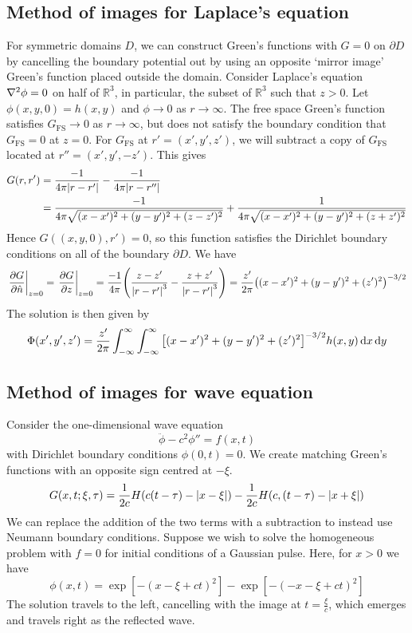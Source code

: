 \subsection{Method of images for Laplace's equation}
For symmetric domains \( D \), we can construct Green's functions with \( G = 0 \) on \( \partial D \) by cancelling the boundary potential out by using an opposite `mirror image' Green's function placed outside the domain.
Consider Laplace's equation \( \laplacian{\phi} = 0 \) on half of \( \mathbb R^3 \), in particular, the subset of \( \mathbb R^3 \) such that \( z > 0 \).
Let \( \phi(x,y,0) = h(x,y) \) and \( \phi \to 0 \) as \( r \to \infty \).
The free space Green's function satisfies \( G_{\mathrm{FS}} \to 0 \) as \( r \to \infty \), but does not satisfy the boundary condition that \( G_{\mathrm{FS}} = 0 \) at \( z = 0 \).
For \( G_{\mathrm{FS}} \) at \( r' = (x',y',z') \), we will subtract a copy of \( G_{\mathrm{FS}} \) located at \( r'' = (x',y',-z') \).
This gives
\begin{align*}
	G(r,r') & = \frac{-1}{4\pi \abs{r - r'}} - \frac{-1}{4\pi \abs{r - r''}}                                                 \\
	        & = \frac{-1}{4\pi \sqrt{(x-x')^2 + (y-y')^2 + (z-z')^2}} + \frac{1}{4\pi \sqrt{(x-x')^2 + (y-y')^2 + (z+z')^2}}
\end{align*}
Hence \( G((x,y,0), r') = 0 \), so this function satisfies the Dirichlet boundary conditions on all of the boundary \( \partial D \).
We have
\[
	\eval{\pdv{G}{\hat n}}_{z = 0} = \eval{\pdv{G}{z}}_{z = 0} = \frac{-1}{4\pi} \qty(\frac{z - z'}{\abs{r - r'}^3} - \frac{z + z'}{\abs{r-r'}^3}) = \frac{z'}{2\pi} \qty((x-x')^2 + (y-y')^2 + (z')^2)^{-3/2}
\]
The solution is then given by
\[
	\Phi(x',y',z') = \frac{z'}{2\pi} \int_{-\infty}^\infty \int_{-\infty}^\infty \qty[ (x - x')^2 + (y-y')^2 + (z')^2 ]^{-3/2} h(x,y) \dd{x}\dd{y}
\]

\subsection{Method of images for wave equation}
Consider the one-dimensional wave equation
\[
	\ddot \phi - c^2 \phi'' = f(x,t)
\]
with Dirichlet boundary conditions \( \phi(0,t) = 0 \).
We create matching Green's functions with an opposite sign centred at \( -\xi \).
\[
	G(x,t;\xi,\tau) = \frac{1}{2c} H(c(t-\tau) - \abs{x-\xi}) - \frac{1}{2c} H(c,(t-\tau) - \abs{x+\xi})
\]
We can replace the addition of the two terms with a subtraction to instead use Neumann boundary conditions.
Suppose we wish to solve the homogeneous problem with \( f = 0 \) for initial conditions of a Gaussian pulse.
Here, for \( x > 0 \) we have
\[
	\phi(x,t) = \exp[-(x-\xi + ct)^2] - \exp[-(-x - \xi + ct)^2]
\]
The solution travels to the left, cancelling with the image at \( t = \frac{\xi}{c} \), which emerges and travels right as the reflected wave.
